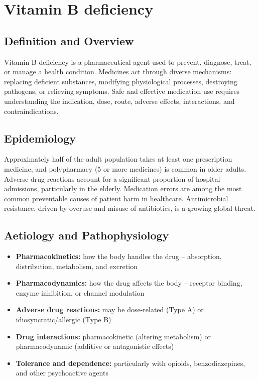 \chapter{Vitamin B deficiency}

\section*{Definition and Overview}
Vitamin B deficiency is a pharmaceutical agent used to prevent, diagnose, treat, or manage a health condition. Medicines act through diverse mechanisms: replacing deficient substances, modifying physiological processes, destroying pathogens, or relieving symptoms. Safe and effective medication use requires understanding the indication, dose, route, adverse effects, interactions, and contraindications.

\section*{Epidemiology}
Approximately half of the adult population takes at least one prescription medicine, and polypharmacy (5 or more medicines) is common in older adults. Adverse drug reactions account for a significant proportion of hospital admissions, particularly in the elderly. Medication errors are among the most common preventable causes of patient harm in healthcare. Antimicrobial resistance, driven by overuse and misuse of antibiotics, is a growing global threat.

\section*{Aetiology and Pathophysiology}
\begin{itemize}
    \item \textbf{Pharmacokinetics:} how the body handles the drug -- absorption, distribution, metabolism, and excretion
    \item \textbf{Pharmacodynamics:} how the drug affects the body -- receptor binding, enzyme inhibition, or channel modulation
    \item \textbf{Adverse drug reactions:} may be dose-related (Type A) or idiosyncratic/allergic (Type B)
    \item \textbf{Drug interactions:} pharmacokinetic (altering metabolism) or pharmacodynamic (additive or antagonistic effects)
    \item \textbf{Tolerance and dependence:} particularly with opioids, benzodiazepines, and other psychoactive agents
\end{itemize}

